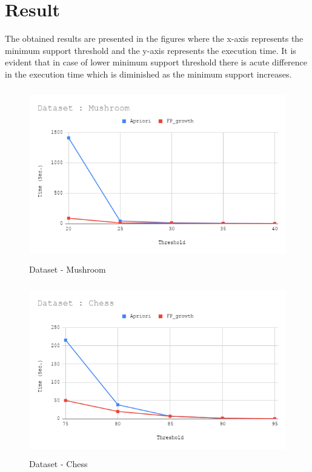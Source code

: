 \documentclass[12pt]{article}
\begin{document}
\section{Result}
The obtained results are presented in the figures where the x-axis represents the minimum support threshold and the y-axis represents the execution time. It is evident that in case of lower minimum support threshold there is acute difference in the execution time which is diminished as the minimum support increases.

\begin{figure}[H]
	\centering
	\includegraphics[width = 0.95\columnwidth, height = 7.5cm]{Mushroom.png}
	\caption{Dataset - Mushroom}
	\label{fig:mushroom}
\end{figure}

\begin{figure}[H]
	\centering
	\includegraphics[width = 0.95\columnwidth, height = 7.5cm]{Chess.png}
	\caption{Dataset - Chess}
	\label{fig:chess}
\end{figure}
\end{document}
